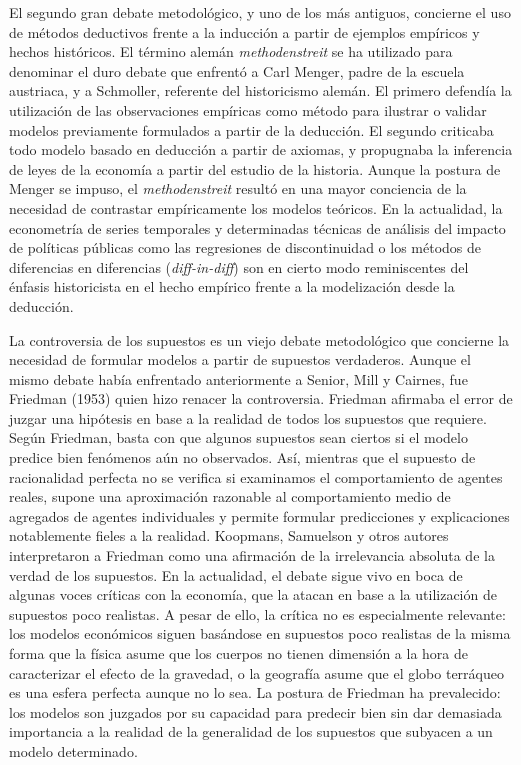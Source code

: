 \documentclass{nuevotema}
\begin{document}
El segundo gran debate metodológico, y uno de los más antiguos, concierne el uso de métodos deductivos frente a la inducción a partir de ejemplos empíricos y hechos históricos. El término alemán \textit{methodenstreit} se ha utilizado para denominar el duro debate que enfrentó a Carl Menger, padre de la escuela austriaca, y a Schmoller, referente del historicismo alemán. El primero defendía la utilización de las observaciones empíricas como método para ilustrar o validar modelos previamente formulados a partir de la deducción. El segundo criticaba todo modelo basado en deducción a partir de axiomas, y propugnaba la inferencia de leyes de la economía a partir del estudio de la historia. Aunque la postura de Menger se impuso, el \textit{methodenstreit} resultó en una mayor conciencia de la necesidad de contrastar empíricamente los modelos teóricos. En la actualidad, la econometría de series temporales y determinadas técnicas de análisis del impacto de políticas públicas como las regresiones de discontinuidad o los métodos de diferencias en diferencias (\textit{diff-in-diff}) son en cierto modo reminiscentes del énfasis historicista en el hecho empírico frente a la modelización desde la deducción. 

La controversia de los supuestos es un viejo debate metodológico que concierne la necesidad de formular modelos a partir de supuestos verdaderos. Aunque el mismo debate había enfrentado anteriormente a Senior, Mill y Cairnes, fue Friedman (1953) quien hizo renacer la controversia. Friedman afirmaba el error de juzgar una hipótesis en base a la realidad de todos los supuestos que requiere. Según Friedman, basta con que algunos supuestos sean ciertos si el modelo predice bien fenómenos aún no observados. Así, mientras que el supuesto de racionalidad perfecta no se verifica si examinamos el comportamiento de agentes reales, supone una aproximación razonable al comportamiento medio de agregados de agentes individuales y permite formular predicciones y explicaciones notablemente fieles a la realidad. Koopmans, Samuelson y otros autores interpretaron a Friedman como una afirmación de la irrelevancia absoluta de la verdad de los supuestos. En la actualidad, el debate sigue vivo en boca de algunas voces críticas con la economía, que la atacan en base a la utilización de supuestos poco realistas. A pesar de ello, la crítica no es especialmente relevante: los modelos económicos siguen basándose en supuestos poco realistas de la misma forma que la física asume que los cuerpos no tienen dimensión a la hora de caracterizar el efecto de la gravedad, o la geografía asume que el globo terráqueo es una esfera perfecta aunque no lo sea. La postura de Friedman ha prevalecido: los modelos son juzgados por su capacidad para predecir bien sin dar demasiada importancia a la realidad de la generalidad de los supuestos que subyacen a un modelo determinado.
\end{document}
